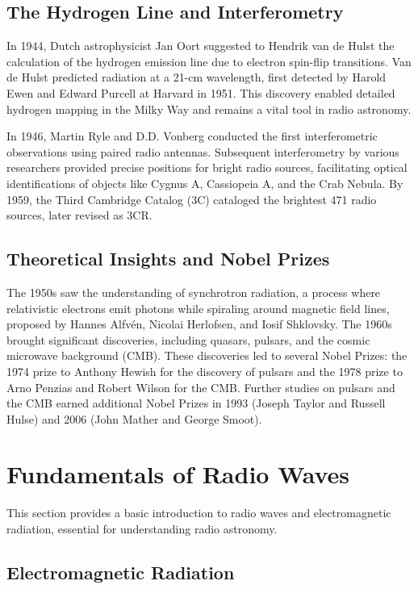 \subsection{The Hydrogen Line and Interferometry}

In 1944, Dutch astrophysicist Jan Oort suggested to Hendrik van de Hulst the calculation of the hydrogen emission line due to electron spin-flip transitions. Van de Hulst predicted radiation at a 21-cm wavelength, first detected by Harold Ewen and Edward Purcell at Harvard in 1951. This discovery enabled detailed hydrogen mapping in the Milky Way and remains a vital tool in radio astronomy.

In 1946, Martin Ryle and D.D. Vonberg conducted the first interferometric observations using paired radio antennas. Subsequent interferometry by various researchers provided precise positions for bright radio sources, facilitating optical identifications of objects like Cygnus A, Cassiopeia A, and the Crab Nebula. By 1959, the Third Cambridge Catalog (3C) cataloged the brightest 471 radio sources, later revised as 3CR.

\subsection{Theoretical Insights and Nobel Prizes}

The 1950s saw the understanding of synchrotron radiation, a process where relativistic electrons emit photons while spiraling around magnetic field lines, proposed by Hannes Alfvén, Nicolai Herlofsen, and Iosif Shklovsky. The 1960s brought significant discoveries, including quasars, pulsars, and the cosmic microwave background (CMB). These discoveries led to several Nobel Prizes: the 1974 prize to Anthony Hewish for the discovery of pulsars and the 1978 prize to Arno Penzias and Robert Wilson for the CMB. Further studies on pulsars and the CMB earned additional Nobel Prizes in 1993 (Joseph Taylor and Russell Hulse) and 2006 (John Mather and George Smoot).

\clearpage

\section{Fundamentals of Radio Waves}

This section provides a basic introduction to radio waves and electromagnetic radiation, essential for understanding radio astronomy.

\subsection{Electromagnetic Radiation}

